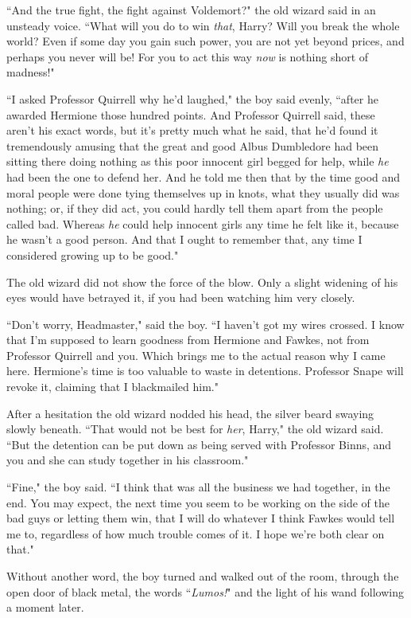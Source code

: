 ``And the true fight, the fight against Voldemort?" the old wizard said in an unsteady voice. ``What will you do to win \emph{that}, Harry? Will you break the whole world? Even if some day you gain such power, you are not yet beyond prices, and perhaps you never will be! For you to act this way \emph{now} is nothing short of madness!"

``I asked Professor Quirrell why he'd laughed," the boy said evenly, ``after he awarded Hermione those hundred points. And Professor Quirrell said, these aren't his exact words, but it's pretty much what he said, that he'd found it tremendously amusing that the great and good Albus Dumbledore had been sitting there doing nothing as this poor innocent girl begged for help, while \emph{he} had been the one to defend her. And he told me then that by the time good and moral people were done tying themselves up in knots, what they usually did was nothing; or, if they did act, you could hardly tell them apart from the people called bad. Whereas \emph{he} could help innocent girls any time he felt like it, because he wasn't a good person. And that I ought to remember that, any time I considered growing up to be good."

The old wizard did not show the force of the blow. Only a slight widening of his eyes would have betrayed it, if you had been watching him very closely.

``Don't worry, Headmaster," said the boy. ``I haven't got my wires crossed. I know that I'm supposed to learn goodness from Hermione and Fawkes, not from Professor Quirrell and you. Which brings me to the actual reason why I came here. Hermione's time is too valuable to waste in detentions. Professor Snape will revoke it, claiming that I blackmailed him."

After a hesitation the old wizard nodded his head, the silver beard swaying slowly beneath. ``That would not be best for \emph{her}, Harry," the old wizard said. ``But the detention can be put down as being served with Professor Binns, and you and she can study together in his classroom."

``Fine," the boy said. ``I think that was all the business we had together, in the end. You may expect, the next time you seem to be working on the side of the bad guys or letting them win, that I will do whatever I think Fawkes would tell me to, regardless of how much trouble comes of it. I hope we're both clear on that."

Without another word, the boy turned and walked out of the room, through the open door of black metal, the words ``\emph{Lumos!}" and the light of his wand following a moment later.

